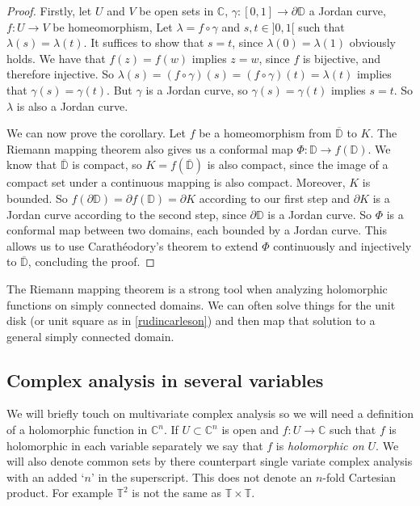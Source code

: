 \documentclass[a4paper,12pt,twoside,BCOR=10mm]{scrbook}
\theoremstyle{definition}
\theoremstyle{definition}
\theoremstyle{definition}
\begin{document}
\begin{proof}
Firstly, let
	$U$ and $V$ be open sets in $\mathbb{C}$,
	$\gamma: [0, 1] \rightarrow \partial \mathbb{D}$ a Jordan curve,
	$f: U \rightarrow V$ be homeomorphism,
Let $\lambda = f \circ \gamma$ and $s, t \in ]0, 1[$ such that $\lambda(s) = \lambda(t)$.
It suffices to show that $s = t$, since $\lambda(0) = \lambda(1)$ obviously holds.
We have that $f(z) = f(w)$ implies $z = w$, since $f$ is bijective, and therefore injective.
So $\lambda(s) = (f \circ \gamma)(s) = (f \circ \gamma)(t) = \lambda(t)$ implies that $\gamma(s) = \gamma(t)$.
But $\gamma$ is a Jordan curve, so $\gamma(s) = \gamma(t)$ implies $s = t$.
So $\lambda$ is also a Jordan curve. 

We can now prove the corollary.
Let $f$ be a homeomorphism from $\overline{\mathbb{D}}$ to $K$.
The Riemann mapping theorem also gives us a conformal map $\Phi: \mathbb{D} \rightarrow f(\mathbb{D})$.
We know that $\overline{\mathbb{D}}$ is compact, so $K = f(\overline{\mathbb{D}})$ is also compact, since the image of a compact set under a continuous mapping is also compact.
Moreover, $K$ is bounded.
So $f(\partial \mathbb{D}) = \partial f(\mathbb{D}) = \partial K$ according to our first step and $\partial K$ is a Jordan curve according to the second step, since $\partial \mathbb{D}$ is a Jordan curve.
So $\Phi$ is a conformal map between two domains, each bounded by a Jordan curve.
This allows us to use Carathéodory's theorem to extend $\Phi$ continuously and injectively to $\overline{\mathbb{D}}$, concluding the proof.
\end{proof}
The Riemann mapping theorem is a strong tool when analyzing holomorphic functions on simply connected domains.
We can often solve things for the unit disk (or unit square as in \ref{rudincarleson}) and then map that solution to a general simply connected domain.

\subsection{Complex analysis in several variables}
We will briefly touch on multivariate complex analysis so we will need a definition of a holomorphic function in $\mathbb{C}^n$.
If $U \subset \mathbb{C}^n$ is open and $f: U \rightarrow \mathbb{C}$ such that $f$ is holomorphic in each variable separately we say that $f$ is \emph{holomorphic on $U$}.
We will also denote common sets by there counterpart single variate complex analysis with an added `$n$' in the superscript.
This does not denote an $n$-fold Cartesian product.
For example $\mathbb{T}^2$ is not the same as $\mathbb{T} \times \mathbb{T}$.
\end{document}
